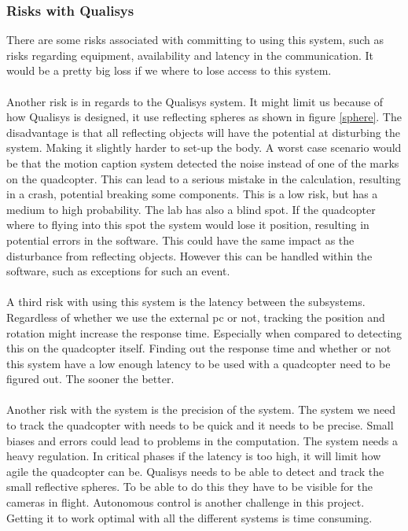 \subsubsection{Risks with Qualisys}
There are some risks associated with committing to using this system, such as risks regarding equipment, availability and latency in the communication. It would be a pretty big loss if we where to lose access to this system. 
\\\\
Another risk is in regards to the Qualisys system. It might limit us because of how Qualisys is designed, it use reflecting spheres as shown in figure \ref{sphere}. The disadvantage is that all reflecting objects will have the potential at disturbing the system. Making it slightly harder to set-up the body. A worst case scenario would be that the motion caption system detected the noise instead of one of the marks on the quadcopter. This can lead to a serious mistake in the calculation, resulting in a crash, potential breaking some components. This is a low risk, but has a medium to high probability. The lab has also a blind spot. If the quadcopter where to flying into this spot the system would lose it position, resulting in potential errors in the software. This could have the same impact as the disturbance from reflecting objects. However this can be handled within the software, such as exceptions for such an event. 
\\\\
A third risk with using this system is the latency between the subsystems. Regardless of whether we use the external pc or not, tracking the position and rotation might increase the response time. Especially when compared to detecting this on the quadcopter itself. Finding out the response time and whether or not this system have a low enough latency to be used with a quadcopter need to be figured out. The sooner the better. 
\\\\
Another risk with the system is the precision of the system. The system we need to track the quadcopter with needs to be quick and it needs to be precise. Small biases and errors could lead to problems in the computation. The system needs a heavy regulation. In critical phases if the latency is too high, it will limit how agile the quadcopter can be. Qualisys needs to be able to detect and track the small reflective spheres. To be able to do this they have to be visible for the cameras in flight. Autonomous control is another challenge in this project. Getting it to work optimal with all the different systems is time consuming. 

